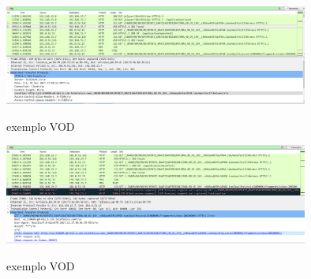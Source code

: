 \begin{figure}[h]
\caption{exemplo VOD}
\includegraphics[width=10cm]{Figuras/exemplo_vod_3.png} 
\label{figura:exemplo_vod_3}
\end{figure}

\begin{figure}[h]
\caption{exemplo VOD}
\includegraphics[width=10cm]{Figuras/exemplo_vod_4.png} 
\label{figura:exemplo_vod_4}
\end{figure}